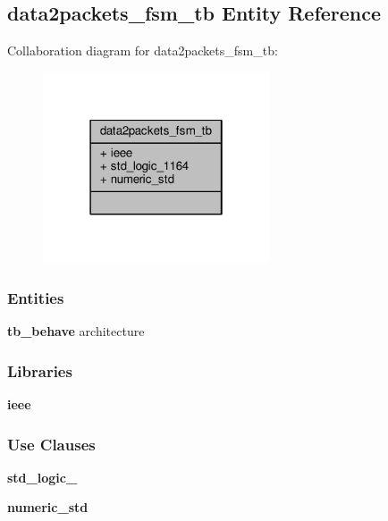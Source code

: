 \subsection{data2packets\+\_\+fsm\+\_\+tb Entity Reference}
\label{classdata2packets__fsm__tb}


Collaboration diagram for data2packets\+\_\+fsm\+\_\+tb\+:\nopagebreak
\begin{figure}[H]
\begin{center}
\leavevmode
\includegraphics[width=190pt]{d1/dfc/classdata2packets__fsm__tb__coll__graph}
\end{center}
\end{figure}
\subsubsection*{Entities}
\begin{DoxyCompactItemize}
\item 
{\bf tb\+\_\+behave} architecture
\end{DoxyCompactItemize}
\subsubsection*{Libraries}
 \begin{DoxyCompactItemize}
\item 
{\bf ieee} 
\end{DoxyCompactItemize}
\subsubsection*{Use Clauses}
 \begin{DoxyCompactItemize}
\item 
{\bf std\+\_\+logic\+\_}   
\item 
{\bf numeric\+\_\+std}   
\end{DoxyCompactItemize}


